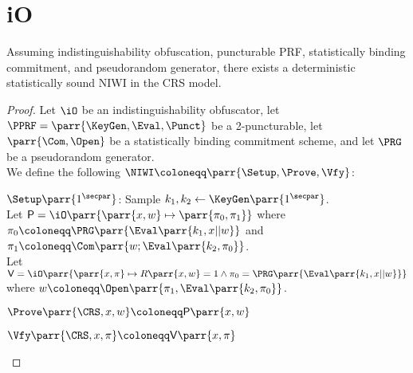\section{iO}

\begin{theorem}
    Assuming indistinguishability obfuscation,
    puncturable PRF,
    statistically binding commitment,
    and pseudorandom generator,
    there exists a deterministic statistically sound NIWI in the CRS model.
\end{theorem}

\begin{proof}
    Let \(\iO\) be an indistinguishability obfuscator,
    let \(\PPRF = \parr{\KeyGen, \Eval, \Punct}\) be a 2-puncturable,
    let \(\parr{\Com,\Open}\) be a statistically binding commitment scheme,
    and let \(\PRG\) be a pseudorandom generator.
    \\
    We define the following \(\NIWI \coloneqq \parr{\Setup, \Prove, \Vfy}\):
    \begin{sitemize}
        \item \(\Setup\parr{1^\secpar}\):
        Sample \(k_1,k_2 \gets \KeyGen\parr{1^\secpar}\).
        \\
        Let \(\mathsf{P} = \iO\parr{\parr{x, w} \mapsto \parr{\pi_0,\pi_1}}\) where \(\pi_0 \coloneqq \PRG\parr{\Eval\parr{k_1,x||w}}\) and \(\pi_1 \coloneqq \Com\parr{w; \Eval\parr{k_2,\pi_0}}\).
        \\
        Let \(\mathsf{V} = \iO\parr{\parr{x, \pi} \mapsto R\parr{x,w} = 1 \wedge \pi_0 = \PRG\parr{\Eval\parr{k_1,x||w}}}\) where \(w \coloneqq \Open\parr{\pi_1, \Eval\parr{k_2,\pi_0}}\).

        \item \(\Prove\parr{\CRS,x,w} \coloneqq \mathsf{P}\parr{x,w}\)

        \item \(\Vfy\parr{\CRS,x,\pi} \coloneqq \mathsf{V}\parr{x,\pi}\)
    \end{sitemize}


\end{proof}
